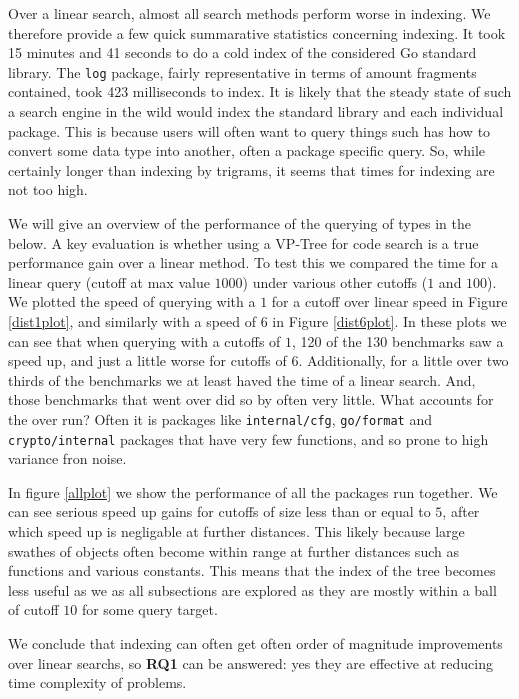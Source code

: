 Over a linear search, almost all search methods perform worse in indexing.
We therefore provide a few quick summarative statistics concerning indexing.
It took 15 minutes and 41 seconds to do a cold index of the considered Go standard library.
The \texttt{log} package, fairly representative in terms of amount fragments contained,
took 423 milliseconds to index. 
It is likely that the steady state of such a search engine in the wild would index the standard library and each individual package.
This is because users will often want to query things such has how to convert some data type into another, often a package specific query.
So, while certainly longer than indexing by trigrams, it seems that times for indexing are not too high.

We will give an overview of the performance of the querying of types in the below.
A key evaluation is whether using a VP-Tree for code search is a true performance gain over a linear method.
To test this we compared the time for a linear query (cutoff at max value $1000$) under various other cutoffs ($1$ and $100$).
We plotted the speed of querying with a $1$ for a cutoff over linear speed in Figure \ref{dist1plot},
and similarly with a speed of $6$ in Figure \ref{dist6plot}.
In these plots we can see that when querying with a cutoffs of $1$, 120 of the 130 benchmarks saw a speed up,
and just a little worse for cutoffs of $6$.
Additionally, for a little over two thirds of the benchmarks we at least haved the time of a linear search.
And, those benchmarks that went over did so by often very little.
What accounts for the over run?
Often it is packages like \texttt{internal/cfg}, \texttt{go/format} and \texttt{crypto/internal} packages that have very few functions,
and so prone to high variance fron noise.

In figure \ref{allplot} we show the performance of all the packages run together.
We can see serious speed up gains for cutoffs of size less than or equal to $5$,
after which speed up is negligable at further distances.
This likely because large swathes of objects often become within range at further distances such as functions and various constants.
This means that the index of the tree becomes less useful as we as all subsections are explored as they are mostly within 
a ball of cutoff $10$ for some query target. 

We conclude that indexing can often get often order of magnitude improvements over linear searchs,
so \textbf{RQ1} can be answered: 
yes they are effective at reducing time complexity of problems.

